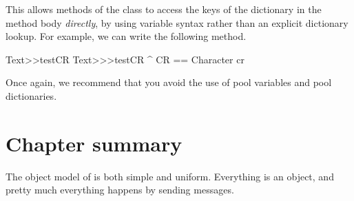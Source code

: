 \documentclass[a4paper,10pt,twoside]{book}
\begin{document}
This allows methods of the class  to access the keys of the dictionary in the method body \emph{directly}, \ie by using variable syntax rather than an explicit dictionary lookup.
For example, we can write the following method. 
  
\begin{method}[texttestcr]{Text>>testCR}
Text>>>testCR 	
      ^ CR == Character cr
\end{method}

Once again,  we recommend that you avoid the use of pool variables and pool dictionaries. 

\section{Chapter summary}

The object model of \pharo is both simple and uniform.
Everything is an object, and pretty much everything happens by sending messages.
\end{document}
